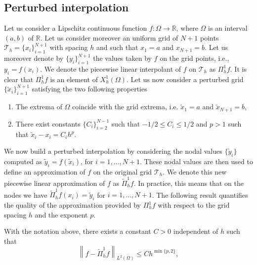 \documentclass{siamart1116}
\numberwithin{theorem}{section}
\newcommand{\norm}[1]{\left\lVert#1\right\rVert}
\newcommand{\R}{\mathbb{R}}
\newcommand{\Tau}{\mathcal{T}}
\begin{document}
\subsection{Perturbed interpolation} Let us consider a Lipschitz continuous function $f\colon\Omega\to\R$, where $\Omega$ is an interval $(a, b)$ of $\R$. Let us consider moreover an uniform grid of $N+1$ points $\Tau_h = \{x_i\}_{i=1}^{N+1}$ with spacing $h$ and such that $x_1 = a$ and $x_{N+1} = b$. Let us moreover denote by $\{y_i\}_{i=1}^{N+1}$ the values taken by $f$ on the grid points, i.e., $y_i = f(x_i)$. We denote the piecewise linear interpolant of $f$ on $\Tau_h$  as $\Pi^1_h f$. It is clear that $\Pi^1_h f$ is an element of $X_h^1(\Omega)$. Let us now consider a perturbed grid $\{\tilde x_i\}_{i=1}^{N+1}$ satisfying the two following properties
\begin{enumerate}
	\item The extrema of $\Omega$ coincide with the grid extrema, i.e. $\tilde x_1 = a$ and $\tilde x_{N+1} = b$,
	\item There exist constants $\{C_i\}_{i=2}^{N-1}$ such that $-1/2 \leq C_i \leq 1/2$ and $p > 1$ such that $\tilde x_i - x_i = C_ih^p$.
\end{enumerate}
We now build a perturbed interpolation by considering the nodal values $\{\tilde y_i\}$ computed as $\tilde y_i = f(\tilde x_i)$, for $i = 1,\ldots, N+1$. These nodal values are then used to define an approximation of $f$ on the original grid $\Tau_h$. We denote this new piecewise linear approximation of $f$ as $\widetilde \Pi_h^1 f$. In practice, this means that on the nodes we have $\widetilde \Pi_h^1 f(x_i) = \tilde y_i$ for $i = 1, \ldots, N+1$. The following result quantifies the quality of the approximation provided by $\Pi_h^1 f$ with respect to the grid spacing $h$ and the exponent $p$.
\begin{lemma}\label{lem:Interp1D} With the notation above, there exists a constant $C > 0$ independent of $h$ such that
\begin{equation}
	\norm{f - \widetilde \Pi_h^1f}_{L^2(\Omega)} \leq C h^{\min\{p,2\}},
\end{equation}
\end{lemma}
\end{document}
